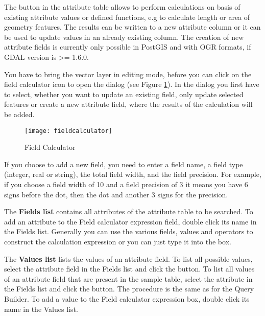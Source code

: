 The  button in the 
attribute table allows to perform calculations on basis of existing 
attribute values or defined functions, e.g to calculate length or area 
of geometry features. The results can be written to a new attribute column 
or it can be used to update values in an already existing column. The creation 
of new attribute fields is currently only possible in PostGIS and with OGR 
formats, if GDAL version is >= 1.6.0. 

You have to bring the vector layer in editing mode, before you can click on 
the field calculator icon to open the dialog (see Figure 
\ref{fig:field_calculator}). In the dialog you first have to select, whether 
you want to update an existing field, only update selected features or 
create a new attribute field, where the results of the calculation will be added. 

\begin{figure}[ht]
  \centering
    \caption{Field Calculator \nixcaption}\label{fig:field_calculator}
    \texttt{[image: fieldcalculator]}
  \end{figure}

If you choose to add a new field, you need to enter a field name, a field type 
(integer, real or string), the total field width, and the field precision. 
For example, if you choose a field width of 10 and a field precision of 3 it 
means you have 6 signs before the dot, then the dot and another 3 signs for the 
precision.   

The \textbf{Fields list} contains all attributes of the attribute table to be
searched. To add an attribute to the Field calculator expression field, double 
click its name in the Fields list. Generally you can use the various fields, 
values and operators to construct the calculation expression or you can just 
type it into the box.

The \textbf{Values list} lists the values of an attribute field. To list all 
possible values, select the attribute field in the Fields list and click the
 button. To list all 
values of an attribute field that are present in the sample table, select the 
attribute in the Fields list and click the  button. The procedure is the same as for the Query 
Builder. To add a value to the Field calculator expression box, double click its 
name in the Values list.


